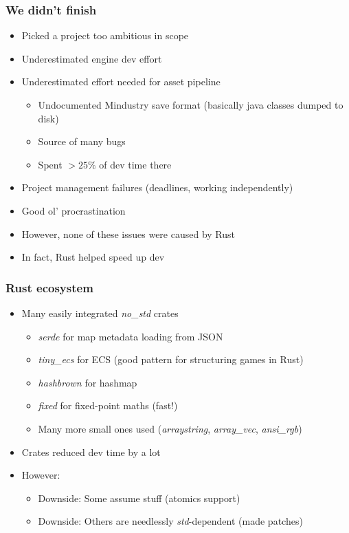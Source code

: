 \documentclass{beamer}
\begin{document}
\begin{frame}
	\frametitle{We didn't finish}
	\begin{itemize}
		\item Picked a project too ambitious in scope
		\item Underestimated engine dev effort
		\item Underestimated effort needed for asset pipeline \begin{itemize}
			      \item Undocumented Mindustry save format (basically java classes dumped to disk)
			      \item Source of many bugs
			      \item Spent $>25\%$ of dev time there
		      \end{itemize}
		\item Project management failures (deadlines, working independently)
		\item Good ol' procrastination
		\item However, none of these issues were caused by Rust
		\item In fact, Rust helped speed up dev
	\end{itemize}
\end{frame}

\begin{frame}
	\frametitle{Rust ecosystem}
	\begin{itemize}
		\item Many easily integrated \emph{no\_std} crates
		      \begin{itemize}
			      \item \emph{serde} for map metadata loading from JSON
			      \item \emph{tiny\_ecs} for ECS (good pattern for structuring games in Rust)
			      \item \emph{hashbrown} for hashmap
			      \item \emph{fixed} for fixed-point maths (fast!)
			      \item Many more small ones used (\emph{arraystring}, \emph{array\_vec}, \emph{ansi\_rgb})
		      \end{itemize}
		\item Crates reduced dev time by a lot
		\item However: \begin{itemize}
			      \item Downside: Some assume stuff (atomics support)
			      \item Downside: Others are needlessly \emph{std}-dependent (made patches)
		      \end{itemize}

	\end{itemize}
\end{frame}
\end{document}
